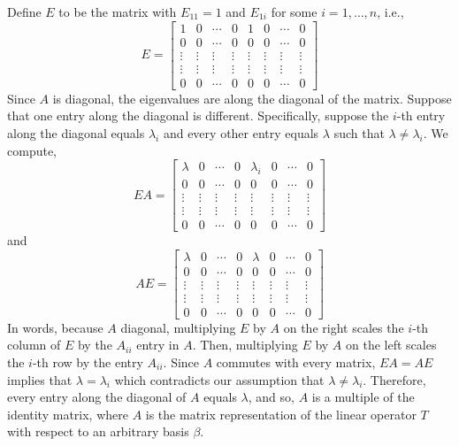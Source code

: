 \documentclass{article}
\begin{document}
Define $E$ to be the matrix with $E_{11} = 1$ and $E_{1i}$ for some $i = 1,\dots, n$, i.e., 
	\[ E = \begin{bmatrix} 1 & 0 & \cdots & 0 & 1 & 0 & \cdots & 0\\
			0 & 0 & \cdots & 0 & 0 & 0 & \cdots & 0\\
			\vdots & \vdots & \vdots & \vdots& \vdots& \vdots & \vdots & \vdots \\
			\vdots & \vdots & \vdots & \vdots& \vdots& \vdots & \vdots & \vdots \\
			0 & 0 & \cdots & 0 & 0 & 0 & \cdots & 0
			\end{bmatrix}\]
Since $A$ is diagonal, the eigenvalues are along the diagonal of the matrix. Suppose that one entry along the diagonal is different. Specifically, suppose the $i$-th entry along the diagonal equals $\lambda_i$ and every other entry equals $\lambda$ such that $\lambda\neq \lambda_i$. We compute,
	\[ EA = \begin{bmatrix} \lambda & 0 & \cdots & 0 & \lambda_i & 0 & \cdots & 0\\
			0 & 0 & \cdots & 0 & 0 & 0 & \cdots & 0\\
			\vdots & \vdots & \vdots & \vdots& \vdots& \vdots & \vdots & \vdots \\
			\vdots & \vdots & \vdots & \vdots& \vdots& \vdots & \vdots & \vdots \\
			0 & 0 & \cdots & 0 & 0 & 0 & \cdots & 0
			\end{bmatrix}\]
and 
	\[ AE = \begin{bmatrix} \lambda & 0 & \cdots & 0 & \lambda & 0 & \cdots & 0\\
			0 & 0 & \cdots & 0 & 0 & 0 & \cdots & 0\\
			\vdots & \vdots & \vdots & \vdots& \vdots& \vdots & \vdots & \vdots \\
			\vdots & \vdots & \vdots & \vdots& \vdots& \vdots & \vdots & \vdots \\
			0 & 0 & \cdots & 0 & 0 & 0 & \cdots & 0
			\end{bmatrix}\]
In words, because $A$ diagonal, multiplying $E$ by $A$ on the right scales the $i$-th column of $E$ by the $A_{ii}$ entry in $A$. Then, multiplying $E$ by $A$ on the left scales the $i$-th row by the entry $A_{ii}$. Since $A$ commutes with every matrix, $EA=AE$ implies that $\lambda = \lambda_i$ which contradicts our assumption that $\lambda\neq \lambda_i$. Therefore, every entry along the diagonal of $A$ equals $\lambda$, and so, $A$ is a multiple of the identity matrix, where $A$ is the matrix representation of the linear operator $T$ with respect to an arbitrary basis $\beta$.  
\end{document}
